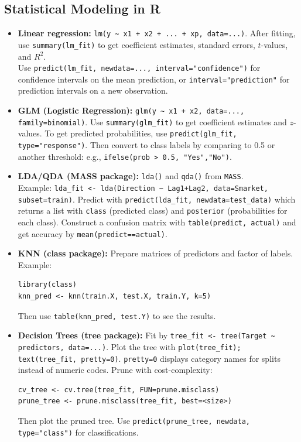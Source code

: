 \documentclass[11pt]{article}
\begin{document}
\subsection{Statistical Modeling in R}
\begin{itemize}
    \item \textbf{Linear regression:} \verb|lm(y ~ x1 + x2 + ... + xp, data=...)|. After fitting, use \verb|summary(lm_fit)| to get coefficient estimates, standard errors, $t$-values, and $R^2$. \\ Use \verb|predict(lm_fit, newdata=..., interval="confidence")| for confidence intervals on the mean prediction, or \verb|interval="prediction"| for prediction intervals on a new observation.
    
    \item \textbf{GLM (Logistic Regression):} \verb|glm(y ~ x1 + x2, data=..., family=binomial)|. Use \verb|summary(glm_fit)| to get coefficient estimates and $z$-values. To get predicted probabilities, use \verb|predict(glm_fit, type="response")|. Then convert to class labels by comparing to 0.5 or another threshold: e.g., \verb|ifelse(prob > 0.5, "Yes","No")|.
    
    \item \textbf{LDA/QDA (MASS package):} \verb|lda()| and \verb|qda()| from \texttt{MASS}. \\ Example: \verb|lda_fit <- lda(Direction ~ Lag1+Lag2, data=Smarket, subset=train)|. Predict with \verb|predict(lda_fit, newdata=test_data)| which returns a list with \texttt{class} (predicted class) and \texttt{posterior} (probabilities for each class). Construct a confusion matrix with \verb|table(predict, actual)| and get accuracy by \verb|mean(predict==actual)|.
    
    \item \textbf{KNN (class package):} Prepare matrices of predictors and factor of labels. Example:
    \begin{verbatim}
library(class)
knn_pred <- knn(train.X, test.X, train.Y, k=5)
    \end{verbatim}
    Then use \verb|table(knn_pred, test.Y)| to see the results.
    
    \item \textbf{Decision Trees (tree package):} Fit by \verb|tree_fit <- tree(Target ~ predictors, data=...)|. Plot the tree with \verb|plot(tree_fit); text(tree_fit, pretty=0)|. \texttt{pretty=0} displays category names for splits instead of numeric codes. Prune with cost-complexity:
    \begin{verbatim}
cv_tree <- cv.tree(tree_fit, FUN=prune.misclass)
prune_tree <- prune.misclass(tree_fit, best=<size>)
    \end{verbatim}
    Then plot the pruned tree. Use \verb|predict(prune_tree, newdata, type="class")| for classifications.
    

\end{itemize}
\end{document}
